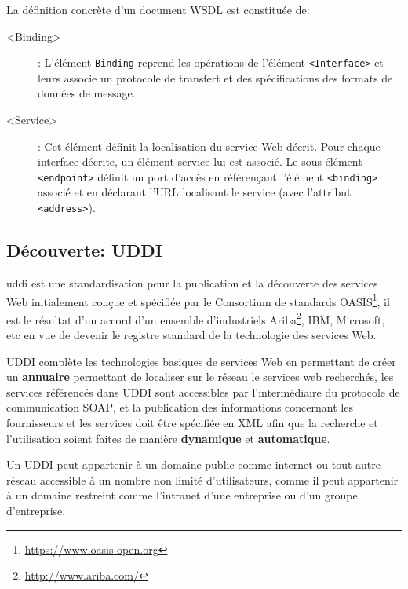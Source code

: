   La définition concrète d'un document \textsc{WSDL} est constituée
  de:

  \SpecialItem
  \renewcommand{\descriptionlabel}[1]{\hspace{1.5cm}\texttt{#1}}
  \begin{description}
  \item[<Binding>]: L'élément \texttt{Binding} reprend les opérations
    de l'élément \texttt{<Interface>} et leurs associe un protocole de
    transfert et des spécifications des formats de données de message.

  \item[<Service>]: Cet élément définit la localisation du service Web
    décrit. Pour chaque interface décrite, un élément service lui est
    associé. Le sous-élément \texttt{<endpoint>} définit un port
    d’accès en référençant l'élément \texttt{<binding>} associé et en
    déclarant l'\textsc{URL} localisant le service (avec l'attribut
    \texttt{<address>}).
  \end{description}
  \newpage
  \subsection{Découverte: UDDI}
  \label{sec:uddi}
  \acrshort{uddi} \cite{clement2004uddi} est une standardisation pour
  la publication et la découverte des services Web initialement conçue
  et spécifiée par le Consortium de standards
  OASIS\footnote{\url{https://www.oasis-open.org}}, il est le résultat
  d'un accord d'un ensemble d'industriels
  Ariba\footnote{\url{http://www.ariba.com/}}, IBM, Microsoft, etc en
  vue de devenir le registre standard de la technologie des services
  Web.

  \textsc{UDDI} complète les technologies basiques de services Web en
  permettant de créer un \textbf{annuaire} permettant de localiser sur
  le réseau le services web recherchés, les services référencés dans
  \textsc{UDDI} sont accessibles par l'intermédiaire du protocole de
  communication \textsc{SOAP}, et la publication des informations
  concernant les fournisseurs et les services doit être spécifiée en
  \textsc{XML} afin que la recherche et l'utilisation soient faites de
  manière \textbf{dynamique} et \textbf{automatique}.

  Un \textsc{UDDI} peut appartenir à un domaine public comme internet
  ou tout autre réseau accessible à un nombre non limité
  d'utilisateurs, comme il peut appartenir à un domaine restreint
  comme l'intranet d'une entreprise ou d'un groupe d'entreprise.

